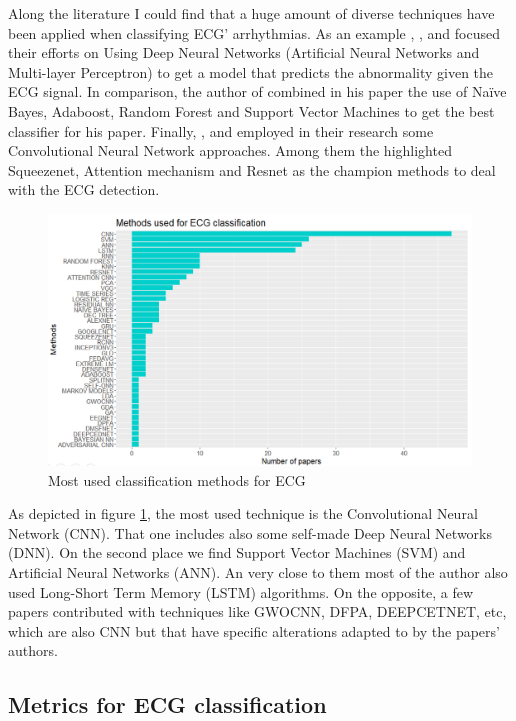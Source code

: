 Along the literature I could find that a huge amount of diverse techniques have been applied when classifying ECG' arrhythmias. As an example \cite{ecg_methods1}, \cite{ecg_methods2}, and \cite{ecg_methods3} focused their efforts on Using Deep Neural Networks (Artificial Neural Networks and Multi-layer Perceptron) to get a model that predicts the abnormality given the ECG signal. In comparison, the author of \cite{ecg_methods4} combined in his paper the use of Naïve Bayes, Adaboost, Random Forest and Support Vector Machines to get the best classifier for his paper. Finally, \cite{ecg_methods5}, \cite{ecg_methods6} and \cite{ecg_methods7} employed in their research some Convolutional Neural Network approaches. Among them the highlighted Squeezenet, Attention mechanism and Resnet as the champion methods to deal with the ECG detection.

 \begin{figure}[H]
\centering
\includegraphics[scale=0.48]{img/classif_methods.PNG}
\caption{Most used classification methods for ECG}
\label{fig:classif_methods}
\end{figure}

As depicted in figure \ref{fig:classif_methods}, the most used technique is the Convolutional Neural Network (CNN). That one includes also some self-made Deep Neural Networks (DNN). On the second place we find Support Vector Machines (SVM) and Artificial Neural Networks (ANN). An very close to them most of the author also used Long-Short Term Memory (LSTM) algorithms. On the opposite, a few papers contributed with techniques like GWOCNN, DFPA, DEEPCETNET, etc, which are also CNN but that have specific alterations adapted to by the papers' authors.

\subsection{Metrics for ECG classification}\label{chap3metrics}


